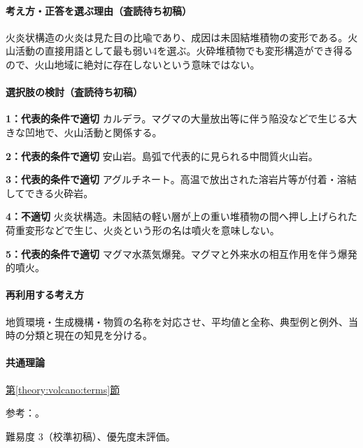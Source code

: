 \paragraph{考え方・正答を選ぶ理由（査読待ち初稿）} 火炎状構造の火炎は見た目の比喩であり、成因は未固結堆積物の変形である。火山活動の直接用語として最も弱い4を選ぶ。火砕堆積物でも変形構造ができ得るので、火山地域に絶対に存在しないという意味ではない。

\paragraph{選択肢の検討（査読待ち初稿）}\mbox{}\par

\noindent\textbf{1：代表的条件で適切} カルデラ。マグマの大量放出等に伴う陥没などで生じる大きな凹地で、火山活動と関係する。\par

\noindent\textbf{2：代表的条件で適切} 安山岩。島弧で代表的に見られる中間質火山岩。\par

\noindent\textbf{3：代表的条件で適切} アグルチネート。高温で放出された溶岩片等が付着・溶結してできる火砕岩。\par

\noindent\textbf{4：不適切} 火炎状構造。未固結の軽い層が上の重い堆積物の間へ押し上げられた荷重変形などで生じ、火炎という形の名は噴火を意味しない。\par

\noindent\textbf{5：代表的条件で適切} マグマ水蒸気爆発。マグマと外来水の相互作用を伴う爆発的噴火。\par

\paragraph{再利用する考え方} 地質環境・生成機構・物質の名称を対応させ、平均値と全称、典型例と例外、当時の分類と現在の知見を分ける。

\paragraph{共通理論} \hyperref[theory:volcano:terms]{第\ref*{theory:volcano:terms}節}

\par 参考：\cite{vol50_terms_ref}。

\par 難易度 3（校準初稿）、優先度未評価。

